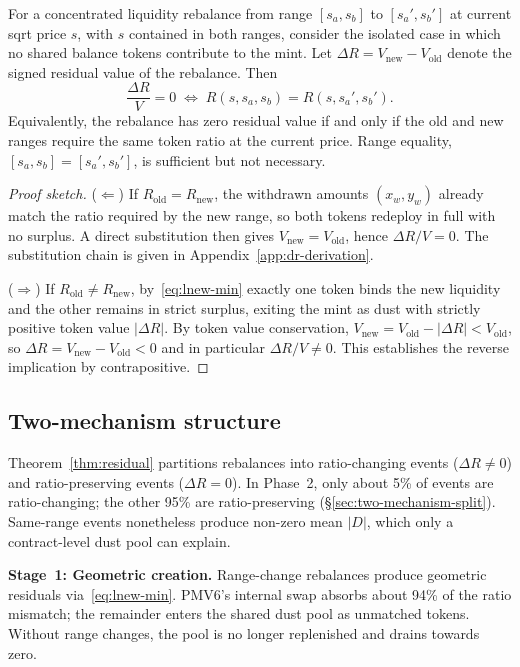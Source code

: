 \documentclass{manuscript}
\begin{document}
\begin{theorem}\label{thm:residual}
For a concentrated liquidity rebalance from range $[s_a, s_b]$ to $[s_a', s_b']$ at current sqrt price $s$, with $s$ contained in both ranges, consider the isolated case in which no shared balance tokens contribute to the mint. Let $\Delta R = V_{\text{new}} - V_{\text{old}}$ denote the signed residual value of the rebalance. Then
\[
\frac{\Delta R}{V} = 0 \;\iff\; R(s, s_a, s_b) = R(s, s_a', s_b').
\]
Equivalently, the rebalance has zero residual value if and only if the old and new ranges require the same token ratio at the current price. Range equality, $[s_a, s_b] = [s_a', s_b']$, is sufficient but not necessary.
\end{theorem}

\begin{proof}[Proof sketch]
($\Leftarrow$) If $R_{\text{old}} = R_{\text{new}}$, the withdrawn amounts $(x_w, y_w)$ already match the ratio required by the new range, so both tokens redeploy in full with no surplus. A direct substitution then gives $V_{\text{new}} = V_{\text{old}}$, hence $\Delta R/V = 0$. The substitution chain is given in Appendix~\ref{app:dr-derivation}.

($\Rightarrow$) If $R_{\text{old}} \neq R_{\text{new}}$, by~\eqref{eq:lnew-min} exactly one token binds the new liquidity and the other remains in strict surplus, exiting the mint as dust with strictly positive token value $|\Delta R|$. By token value conservation, $V_{\text{new}} = V_{\text{old}} - |\Delta R| < V_{\text{old}}$, so $\Delta R = V_{\text{new}} - V_{\text{old}} < 0$ and in particular $\Delta R/V \neq 0$. This establishes the reverse implication by contrapositive.
\end{proof}

\subsection{Two-mechanism structure}\label{sec:two-mechanism}

Theorem~\ref{thm:residual} partitions rebalances into ratio-changing events ($\Delta R \neq 0$) and ratio-preserving events ($\Delta R = 0$). In Phase~2, only about 5\% of events are ratio-changing; the other 95\% are ratio-preserving (\S\ref{sec:two-mechanism-split}). Same-range events nonetheless produce non-zero mean $|D|$, which only a contract-level dust pool can explain.

\textbf{Stage~1: Geometric creation.} Range-change rebalances produce geometric residuals via~\eqref{eq:lnew-min}. PMV6's internal swap absorbs about 94\% of the ratio mismatch; the remainder enters the shared dust pool as unmatched tokens. Without range changes, the pool is no longer replenished and drains towards zero.
\end{document}
